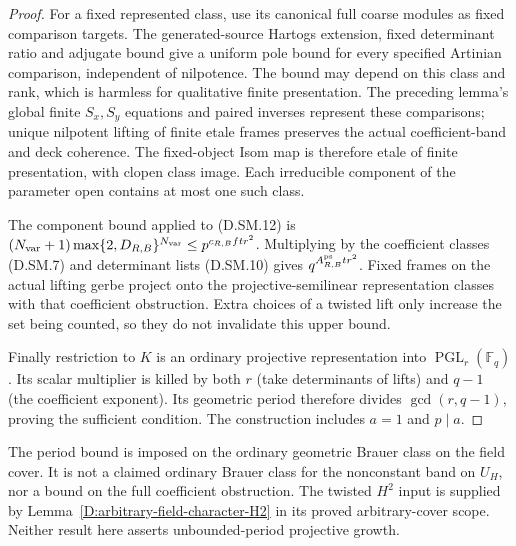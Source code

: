 \begin{proof}
For a fixed represented class, use its canonical
full coarse modules as fixed comparison targets.
The generated-source Hartogs extension, fixed
determinant ratio and adjugate bound give a uniform
pole bound for every specified Artinian comparison,
independent of nilpotence. The bound may depend on
this class and rank, which is harmless for qualitative
finite presentation. The preceding lemma's global
finite $S_x,S_y$ equations and paired inverses
represent these comparisons; unique nilpotent
lifting of finite etale frames preserves the actual
coefficient-band and deck coherence.
The fixed-object Isom map is therefore etale of
finite presentation, with clopen class image.
Each irreducible component of the parameter open
contains at most one such class.

The component bound applied to (D.SM.12) is
$(N_{\rm var}+1)\max\{2,D_{R,B}\}^{N_{\rm var}}
\le p^{c_{R,B}ft r^2}$.
Multiplying by the coefficient classes (D.SM.7)
and determinant lists (D.SM.10) gives
$q^{A_{R,B}^{\rm ps}tr^2}$.
Fixed frames on the actual lifting gerbe project
onto the projective-semilinear representation classes
with that coefficient obstruction. Extra choices
of a twisted lift only increase the set being counted,
so they do not invalidate this upper bound.

Finally restriction to $K$ is an ordinary projective
representation into $\operatorname{PGL}_r(\mathbb F_q)$.
Its scalar multiplier is killed by both $r$ (take
determinants of lifts) and $q-1$ (the coefficient
exponent). Its geometric period therefore divides
$\gcd(r,q-1)$, proving the sufficient condition.
The construction includes $a=1$ and $p\mid a$.
\end{proof}

\begin{remark}
The period bound is imposed on the ordinary geometric
Brauer class on the field cover. It is not a claimed
ordinary Brauer class for the nonconstant band on $U_H$,
nor a bound on the full coefficient obstruction.
The twisted $H^2$ input is supplied by
Lemma~\ref{D:arbitrary-field-character-H2} in its proved
arbitrary-cover scope. Neither result here asserts
unbounded-period projective growth.
\end{remark}
